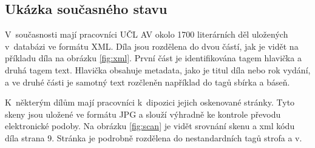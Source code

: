 \documentclass[thesis=B,czech]{FITthesis}[2012/06/26]
\begin{document}
\begin{introduction}
    \section{Ukázka současného stavu}

        V~současnosti mají pracovníci UČL AV okolo 1700 literárních děl uložených v~databázi ve formátu XML. Díla jsou rozdělena do dvou částí, jak je vidět na příkladu díla  na obrázku \ref{fig:xml}. První část je identifikována tagem hlavička a druhá tagem text. Hlavička obsahuje metadata, jako je titul díla nebo rok vydání, a ve druhé části je samotný text rozčleněn například do tagů sbírka a báseň.
        
        K~některým dílům mají pracovníci k~dipozici jejich oskenované stránky. Tyto skeny jsou uložené ve formátu JPG a slouží výhradně ke kontrole převodu elektronické podoby. Na obrázku \ref{fig:scan} je vidět srovnání skenu a xml kódu díla  strana 9. Stránka je podrobně rozdělena do nestandardních tagů strofa a v.
        
\end{introduction}

    


    



\end{document}
